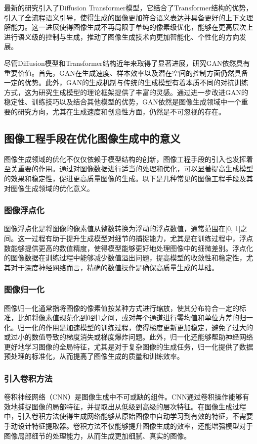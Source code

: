 \documentclass[UTF8]{ctexart}
\begin{document}
最新的研究引入了Diffusion Transformer模型，它结合了Transformer结构的优势，引入了全流程语义引导，使得生成的图像更加符合语义表达并具备更好的上下文理解能力。这一进展使得图像生成不再局限于单纯的像素级优化，能够在更高层次上进行语义级的控制与生成，推动了图像生成技术向更加智能化、个性化的方向发展。\par
尽管Diffusion模型和Transformer结构近年来取得了显著进展，研究GAN依然具有重要价值。首先，GAN在生成速度、样本效率以及潜在空间的控制方面仍然具备一定的优势。此外，GAN的生成机制与传统的生成模型有着本质不同的对抗训练方式，这为研究生成模型的理论框架提供了丰富的灵感。通过进一步改进GAN的稳定性、训练技巧以及结合其他模型的优势，GAN依然是图像生成领域中一个重要的研究方向，尤其在生成速度和创意性方面，仍然是不可忽视的存在。
\subsection{图像工程手段在优化图像生成中的意义}

图像生成领域的优化不仅仅依赖于模型结构的创新，图像工程手段的引入也发挥着至关重要的作用。通过对图像数据进行适当的处理和优化，可以显著提高生成模型的效果和稳定性，促进更高质量图像的生成。以下是几种常见的图像工程手段及其对图像生成领域的优化意义。
\subsubsection{图像浮点化}
图像浮点化是将图像的像素值从整数转换为浮动的浮点数值，通常范围在[0, 1]之间。这一过程有助于提升生成模型对细节的捕捉能力，尤其是在训练过程中，浮点数能够提供更高的数值精度，使得模型能够更好地处理图像中的细微差别。浮点化的图像数据在训练过程中能够减少数值溢出问题，提高模型的收敛性和稳定性，尤其对于深度神经网络而言，精确的数值操作是确保高质量生成的基础。
\subsubsection{图像归一化}
图像归一化通常指将图像的像素值按某种方式进行缩放，使其分布符合一定的标准，比如将像素值规范化到0到1之间，或对每个通道进行零均值和单位方差的归一化。归一化的作用是加速模型的训练过程，使得梯度更新更加稳定，避免了过大的或过小的数值导致的梯度消失或梯度爆炸问题。此外，归一化还能够帮助神经网络更好地学习图像的全局特征，尤其是对于复杂图像的生成任务，归一化提供了数据预处理的标准化，从而提高了图像生成的质量和训练效率。
\subsubsection{引入卷积方法}
卷积神经网络（CNN）是图像生成中不可或缺的组件。CNN通过卷积操作能够有效地捕捉图像的局部特征，并提取出从低级到高级的层次特征。在图像生成过程中，引入卷积方法使得生成网络能够从原始图像中自动学习到有效的特征，不需要手动设计特征提取器。卷积方法不仅能够提升图像生成的效率，还能增强模型对于图像局部细节的处理能力，从而生成更加细腻、真实的图像。
\end{document}
